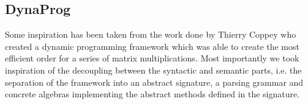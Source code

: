 \subsection{DynaProg}
Some inspiration has been taken from the work done by Thierry Coppey who created a dynamic programming framework which was able to create the most efficient order for a series of matrix multiplications.
Most importantly we took inspiration of the decoupling between the syntactic and semantic parts, i.e. the separation of the framework into an abstract signature, a parsing grammar and concrete algebras implementing the abstract methods defined in the signature.
